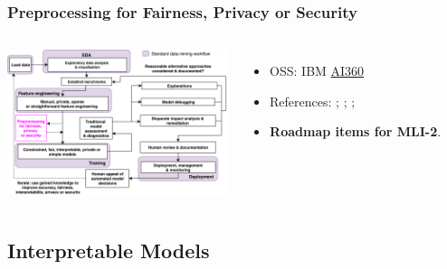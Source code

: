 \documentclass[11pt,
               aspectratio=169,
               hyperref={colorlinks}
               ]{beamer}
\begin{document}
			\begin{frame}
		
				\frametitle{Preprocessing for Fairness, Privacy or Security}		
			
				\begin{columns}
	
					\centering
					\includegraphics[height=120pt]{img/pre.png}
				
					\vspace{-5pt}
					\begin{itemize}
						\item OSS: IBM \href{https://github.com/IBM/AIF360}{AI360}
						\item References: ; ; ; 
						\item \textbf{Roadmap items for MLI-2}.
					\end{itemize}
				
				\end{columns}			
			
			\end{frame}
			
		\subsection{Interpretable Models}
			
\end{document}
